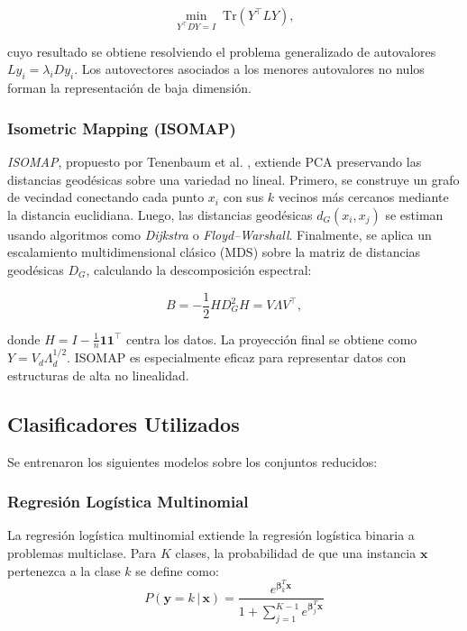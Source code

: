 \documentclass[conference]{IEEEtran}
\begin{document}
\begin{equation}
\min_{Y^\top D Y = I} \; \mathrm{Tr}(Y^\top L Y),
\end{equation}

cuyo resultado se obtiene resolviendo el problema generalizado de autovalores $L y_i = \lambda_i D y_i$.  
Los autovectores asociados a los menores autovalores no nulos forman la representación de baja dimensión.

\subsubsection{Isometric Mapping (ISOMAP)}

\textit{ISOMAP}, propuesto por Tenenbaum et al. \cite{tenenbaum2000isomap}, extiende PCA preservando las distancias geodésicas sobre una variedad no lineal.  
Primero, se construye un grafo de vecindad conectando cada punto $x_i$ con sus $k$ vecinos más cercanos mediante la distancia euclidiana.  
Luego, las distancias geodésicas $d_G(x_i, x_j)$ se estiman usando algoritmos como \textit{Dijkstra} o \textit{Floyd–Warshall}.  
Finalmente, se aplica un escalamiento multidimensional clásico (MDS) sobre la matriz de distancias geodésicas $D_G$, calculando la descomposición espectral:

\begin{equation}
B = -\frac{1}{2} H D_G^2 H = V \Lambda V^\top,
\end{equation}

donde $H = I - \frac{1}{n}\mathbf{1}\mathbf{1}^\top$ centra los datos.  
La proyección final se obtiene como $Y = V_d \Lambda_d^{1/2}$.  
ISOMAP es especialmente eficaz para representar datos con estructuras de alta no linealidad.



\subsection{Clasificadores Utilizados}
Se entrenaron los siguientes modelos sobre los conjuntos reducidos:


\subsubsection{Regresión Logística Multinomial}
La regresión logística multinomial extiende la regresión logística binaria a problemas multiclase. Para $K$ clases, la probabilidad de que una instancia $\mathbf{x}$ pertenezca a la clase $k$ se define como:
\begin{equation}
P(\mathbf{y} = k \,|\, \mathbf{x}) = \frac{e^{\mathbf{\beta}_k^T \mathbf{x}}}{1 + \sum_{j=1}^{K-1} e^{\mathbf{\beta}_j^T \mathbf{x}}}
\label{eq:logistic_prob}
\end{equation}
\end{document}
